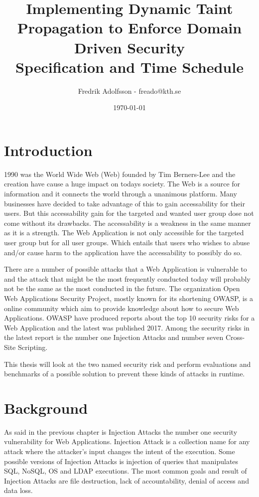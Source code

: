 \documentclass{../kththesis}
\title{Implementing Dynamic Taint Propagation to Enforce Domain Driven Security \\
        \large Specification and Time Schedule}
\author{Fredrik Adolfsson - freado@kth.se}
\date{\today}
\begin{document}
\frontmatter


\titlepage


\tableofcontents


\mainmatter



\chapter{Introduction}
1990 was the World Wide Web (Web) founded by Tim Berners-Lee and the creation have cause a huge impact on todays society. \parencite{www} The Web is a source for information and it connects the world through a unanimous platform. Many businesses have decided to take advantage of this to gain accessability for their users. But this accessability gain for the targeted and wanted user group dose not come without its drawbacks. The accessability is a weakness in the same manner as it is a strength. The Web Application is not only accessible for the targeted user group but for all user groups. Which entails that users who wishes to abuse and/or cause harm to the application have the accessability to possibly do so. 

There are a number of possible attacks that a Web Application is vulnerable to and the attack that might be the most frequently conducted today will probably not be the same as the most conducted in the future. The organization Open Web Applications Security Project, mostly known for its shortening OWASP, is a online community which aim to provide knowledge about how to secure Web Applications. \parencite{OpenWebApplicationSecurityProject} OWASP have produced reports about the top 10 security risks for a Web Application and the latest was published 2017. Among the security risks in the latest report is the number one Injection Attacks and number seven Cross-Site Scripting. \parencite{OWASP2017, OpenWebApplicationSecurityProject, CrossMichael2007Dgtw}

This thesis will look at the two named security risk and perform evaluations and benchmarks of a possible solution to prevent these kinds of attacks in runtime. 



\chapter{Background}
As said in the previous chapter is Injection Attacks the number one security vulnerability for Web Applications. Injection Attack is a collection name for any attack where the attacker's input changes the intent of the execution. Some possible versions of Injection Attacks is injection of queries that manipulates SQL, NoSQL, OS and LDAP executions. \parencite{OWASP2017} The most common goals and result of Injection Attacks are file destruction, lack of accountability, denial of access and data loss. \parencite{Secure_Web}
\end{document}
